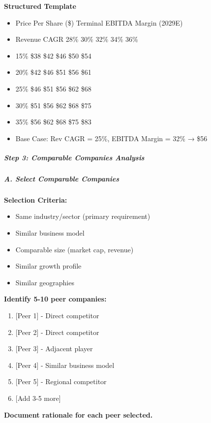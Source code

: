 \documentclass[11pt]{article}
\begin{document}
\textbf{Structured Template}
\begin{itemize}[leftmargin=*,itemsep=2pt,topsep=2pt]
\item {} Price Per Share (\$) Terminal EBITDA Margin (2029E)
\item {} Revenue CAGR 28\% 30\% 32\% 34\% 36\%
\item {} 15\% \$38 \$42 \$46 \$50 \$54
\item {} 20\% \$42 \$46 \$51 \$56 \$61
\item {} 25\% \$46 \$51 \$56 \$62 \$68
\item {} 30\% \$51 \$56 \$62 \$68 \$75
\item {} 35\% \$56 \$62 \$68 \$75 \$83
\item {} Base Case: Rev CAGR = 25\%, EBITDA Margin = 32\% → \$56
\end{itemize}

\subparagraph{Step 3: Comparable Companies Analysis}\mbox{}\par

\subparagraph{A. Select Comparable Companies}\mbox{}\par

\textbf{Selection Criteria:}

\begin{itemize}[leftmargin=*,itemsep=2pt,topsep=2pt]
\item {} Same industry/sector (primary requirement)
\item {} Similar business model
\item {} Comparable size (market cap, revenue)
\item {} Similar growth profile
\item {} Similar geographies
\end{itemize}

\textbf{Identify 5-10 peer companies:}

\begin{enumerate}[leftmargin=*,itemsep=2pt,topsep=2pt]
\item {} [Peer 1] - Direct competitor
\item {} [Peer 2] - Direct competitor
\item {} [Peer 3] - Adjacent player
\item {} [Peer 4] - Similar business model
\item {} [Peer 5] - Regional competitor
\item {} [Add 3-5 more]
\end{enumerate}

\textbf{Document rationale for each peer selected.}
\end{document}
